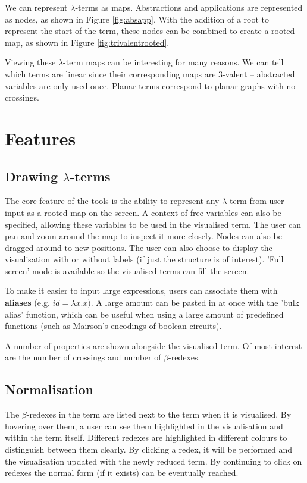\documentclass[11pt]{article}
\begin{document}
We can represent $\lambda$-terms as maps. Abstractions and applications are represented as nodes, as shown in Figure \ref{fig:absapp}. With the addition of a root to represent the start of the term, these nodes can be combined to create a rooted map, as shown in Figure \ref{fig:trivalentrooted}.

Viewing these $\lambda$-term maps can be interesting for many reasons. We can tell which terms are linear since their corresponding maps are 3-valent -- abstracted variables are only used once. Planar terms correspond to planar graphs with no crossings.

\newpage

\section{Features}
\label{sec:features}

\subsection{Drawing \texorpdfstring{$\lambda$}{lambda}-terms}
The core feature of the tools is the ability to represent any $\lambda$-term from user input as a rooted map on the screen. A context of free variables can also be specified, allowing these variables to be used in the visualised term. The user can pan and zoom around the map to inspect it more closely. Nodes can also be dragged around to new positions. The user can also choose to display the visualisation with or without labels (if just the structure is of interest). 'Full screen' mode is available so the visualised terms can fill the screen.

To make it easier to input large expressions, users can associate them with \textbf{aliases} (e.g. $id = \lambda x. x)$. A large amount can be pasted in at once with the 'bulk alias' function, which can be useful when using a large amount of predefined functions (such as Mairson's encodings of boolean circuits).

A number of properties are shown alongside the visualised term. Of most interest are the number of crossings and number of $\beta$-redexes.

\subsection{Normalisation}

The $\beta$-redexes in the term are listed next to the term when it is visualised. By hovering over them, a user can see them highlighted in the visualisation and within the term itself. Different redexes are highlighted in different colours to distinguish between them clearly. By clicking a redex, it will be performed and the visualisation updated with the newly reduced term. By continuing to click on redexes the normal form (if it exists) can be eventually reached.
\end{document}
